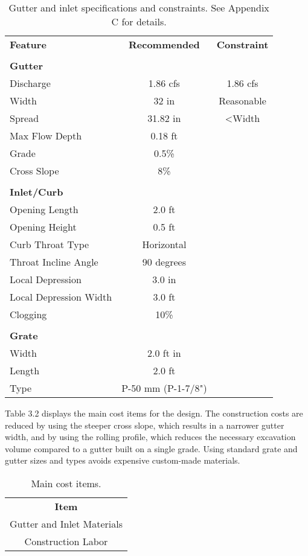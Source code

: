 \documentclass[11pt,letterpaper,final]{report}
\begin{document}
\begin{table}[H]
\centering
\caption{Gutter and inlet specifications and constraints. See Appendix C for details.}
\begin{tabular}{lcc}
\textbf{Feature}&\textbf{Recommended}&\textbf{Constraint}\\ \\
\textbf{Gutter}&&\\
\hline
Discharge&1.86 cfs&1.86 cfs\\
Width& 32 in & Reasonable\\
Spread & 31.82 in& <Width\\
Max Flow Depth& 0.18 ft & \\
Grade & 0.5\%&\\
Cross Slope& 8\%& \\ \\
\textbf{Inlet/Curb}&&\\
\hline
Opening Length&2.0 ft&\\
Opening Height& 0.5 ft&\\
Curb Throat Type&Horizontal&\\
Throat Incline Angle&90 degrees&\\
Local Depression & 3.0 in& \\
Local Depression Width & 3.0 ft &\\
Clogging&10\%&\\ \\
\textbf{Grate}&&\\
\hline
Width& 2.0 ft in& \\
Length & 2.0 ft &\\
Type&P-50 mm (P-1-7/8")&\\ \hline
\end{tabular}
\end{table}
Table 3.2 displays the main cost items for the design. The construction costs are reduced by using the steeper cross slope, which results in a narrower gutter width, and by using the rolling profile, which reduces the necessary excavation volume compared to a gutter built on a single grade. Using standard grate and gutter sizes and types avoids expensive custom-made materials.
\begin{table}[H]
\centering
\caption{Main cost items.}
\begin{tabular}{c}
\textbf{Item}\\
Gutter and Inlet Materials\\
Construction Labor\\ \hline
\end{tabular}
\end{table}
\end{document}
